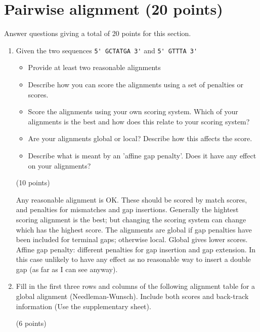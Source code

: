 \documentclass[11pt]{article}
\begin{document}
\section{Pairwise alignment (20 points)}
Answer questions giving a total of 20 points for this section.
\begin{enumerate}
\item Given the two sequences \verb|5' GCTATGA 3'| and \verb|5' GTTTA 3'|\\
  \begin{itemize}
    \item Provide at least two reasonable alignments
    \item Describe how you can score the alignments using a set of penalties
      or scores.
    \item Score the alignments using your own scoring system. Which of your
      alignments is the best and how does this relate to your scoring system?
    \item Are your alignments global or local? Describe how this affects the
      score.
    \item Describe what is meant by an 'affine gap penalty'. Does it have any
      effect on your alignments?
  \end{itemize}
  (10 points)

\begin{Notes}
  Any reasonable alignment is OK. These should be scored by match scores, 
  and penalties for mismatches and gap insertions. Generally the hightest
  scoring alignment is the best; but changing the scoring system can change
  which has the highest score. The alignments are global if gap penalties
  have been included for terminal gaps; otherwise local. Global gives lower
  scores. Affine gap penalty: different penalties for gap insertion and gap
  extension. In this case unlikely to have any effect as no reasonable way
  to insert a double gap (as far as I can see anyway).
\end{Notes}

\item Fill in the first three rows and columns of the following alignment
  table for a global alignment (Needleman-Wunsch). Include both scores and
  back-track information (Use the supplementary sheet).
  \begin{figure}[H]
    \begin{tikzpicture}[scale=0.6]
      
    \end{tikzpicture}
  \end{figure}
  (6 points)


\end{enumerate}
\end{document}
